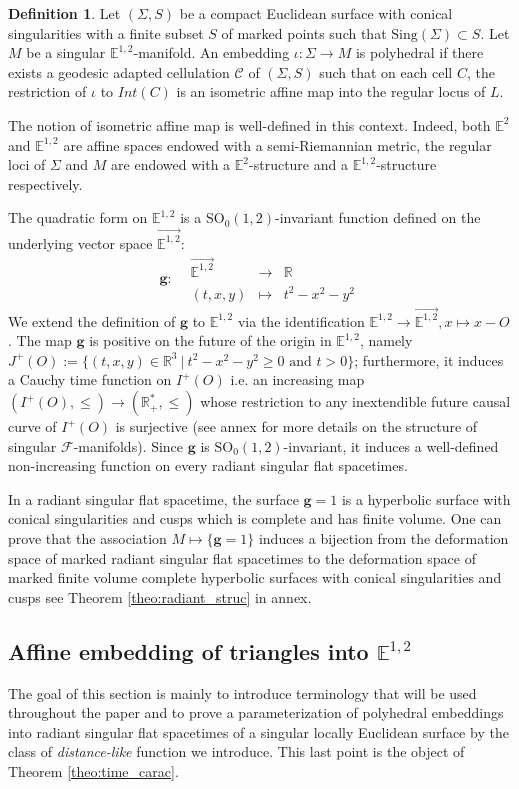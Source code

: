 \documentclass[a4paper,12pt]{article}
\def\E{\mathbf E}
\def\SO{\mathrm{SO}}
\def\E{\mathbb{E}}
\def\sing{\mathrm{Sing}}
\def\RR{\mathbb{R}}
\newcommand{\mass}[1]{{\mathbb E}^{1,2}_{#1}}
\def\SO{\mathrm{SO}}
\def\quadform{\mathbf{g}}
\def\Cell{\mathcal C}
\def\E{\mathbb{E}}
\def\sing{\mathrm{Sing}}
\def\sing{\mathrm{Sing}}
\newcommand{\function}[5]{\displaystyle#1:\begin{array}{l|rcl}
& \displaystyle #2 & \longrightarrow & \displaystyle #3 \\
	& \displaystyle #4 & \longmapsto & \displaystyle #5 \end{array}}
\theoremstyle{definition}
\newtheorem{defi}[lem]{Definition}	%
\begin{document}
					\begin{defi}\label{def:compact_euclidean_surface_conical_2} Let $(\Sigma, S)$ be a compact Euclidean surface with conical singularities with a finite subset $S$ of marked points such that $\sing(\Sigma)\subset S$. Let $M$ be a singular $\mass{}$-manifold.
					An embedding $\iota: \Sigma \rightarrow M$ is polyhedral if there exists a geodesic adapted cellulation $\Cell$ of $(\Sigma, S)$ such that on each cell $C$, the restriction of $\iota$ to 
					 $Int(C)$ is an isometric affine map into the regular locus of $L$.
					\end{defi}
					
					The notion of isometric affine map is well-defined in this context. Indeed, both $\E^2$ and $\mass{}$ are affine spaces endowed with a semi-Riemannian metric, the regular loci of $\Sigma$ and $M$ are endowed with a $\E^2$-structure and a $\mass{}$-structure respectively.

					
					
					The quadratic form on $\mass{}$ is a $\SO_0(1,2)$-invariant function defined on the underlying vector space $\overrightarrow{\mass{}}$: 
			$$\function{\quadform}{\overrightarrow{\mass{}}}{\RR}{(t,x,y)}{t^2-x^2-y^2}$$
		We extend the definition of $\quadform$ to $\mass{}$ via the identification $\mass{}\rightarrow \overrightarrow{\mass{}}, x\mapsto x-O$.
		The map $\quadform$ is positive on the future of the origin in $\mass{}$, namely $J^+(O):= \{(t,x,y)\in \RR^3 ~|~ t^2-x^2-y^2\geq 0 \text{~and~} t>0\}$; furthermore, it induces a Cauchy time function on $I^+(O)$ i.e. an increasing map $(I^+(O),\leq)\rightarrow (\RR_+^*,\leq)$ whose restriction to any inextendible future causal curve of $I^+(O)$ is surjective (see annex for more details on the structure of singular $\mathcal F$-manifolds). 
		Since $\quadform$ is $\SO_0(1,2)$-invariant, it induces a well-defined non-increasing function on every radiant singular flat spacetimes.
				
				
		In a radiant singular flat spacetime, the surface $\quadform = 1$ is a hyperbolic surface with conical singularities and cusps which is complete and has finite volume. One can prove that the association $M \mapsto \{\quadform=1\}$ induces a bijection from the deformation space of marked radiant singular flat spacetimes to the deformation space of marked finite volume complete hyperbolic surfaces with conical singularities and cusps see Theorem \ref{theo:radiant_struc} in annex.
		
		\subsection{Affine embedding of triangles into $\mass{}$}
							The goal of this section is mainly to introduce terminology that will be used throughout the paper and to prove a parameterization of polyhedral embeddings into radiant singular flat spacetimes of a singular locally Euclidean surface by the class  of {\it distance-like} function we introduce. This last point is the object of Theorem \ref{theo:time_carac}.
							
\end{document}
